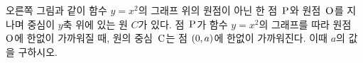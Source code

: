 \noindent\begin{minipage}[t]{0.58\linewidth}\vspace{0pt}\raggedright 오른쪽 그림과 같이 함수 $y=x^2$의 그래프 위의 원점이 아닌 한 점~$\mathrm{P}$와 원점~$\mathrm{O}$를 지나며 중심이 $y$축 위에 있는 원 $C$가 있다. 점~$\mathrm{P}$가 함수 $y=x^2$의 그래프를 따라 원점~$\mathrm{O}$에 한없이 가까워질 때, 원의 중심~$\mathrm{C}$는 점 $(0{,}\mkern3mu\mathopen{}a)$에 한없이 가까워진다. 이때 $a$의 값을 구하시오.\end{minipage}\hfill\begin{minipage}[t]{0.4\linewidth}\vspace{0pt}\centering \resizebox{\ifdim\width>\linewidth\linewidth\else\width\fi}{!}{}\end{minipage}\par

